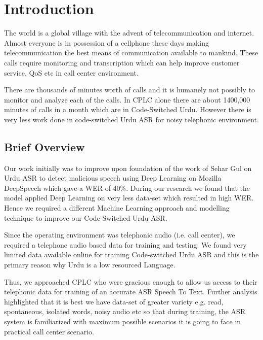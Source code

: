 
\chapter{Introduction} %
\label{cha:intro}

The world is a global village with the advent of telecommunication and internet. Almost everyone is in possession of a cellphone these days making telecommunication the best means of communication available to mankind. These calls require monitoring and transcription which can help improve customer service, QoS etc in call center environment. 
\par
There are thousands of minutes worth of calls and it is humanely not possibly to monitor and analyze each of the calls. In CPLC alone there are about 1400,000 minutes of calls in a month which are in Code-Switched Urdu. However there is very less work done in code-switched Urdu ASR for noisy telephonic environment. 
\par
\par 

\section{Brief Overview} %
Our work initially was to improve upon foundation of the work of Sehar Gul \cite{sehar_gul_detecting_2020} on Urdu ASR to detect malicious speech using Deep Learning on Mozilla DeepSpeech \cite{mozilla_deep_nodate} which gave a WER of 40\%. During our research we found that the model applied Deep Learning on very less data-set which resulted in high WER. Hence we required a different Machine Learning approach and modelling technique to improve our Code-Switched Urdu ASR. 
\par
Since the operating environment was telephonic audio (i.e. call center), we required a telephone audio based data for training and testing. We found very limited data available online for training Code-switched Urdu ASR and this is the primary reason why Urdu is a low resourced Language. 
\par
Thus, we approached CPLC \cite{cplc_cplc_nodate} who were gracious enough to allow us access to their telephonic data for training of an accurate ASR Speech To Text. Further analysis highlighted that it is best we have data-set of greater variety e.g. read, spontaneous, isolated words, noisy audio etc so that during training, the ASR system is familiarized with maximum possible scenarios it is going to face in practical call center scenario. 

